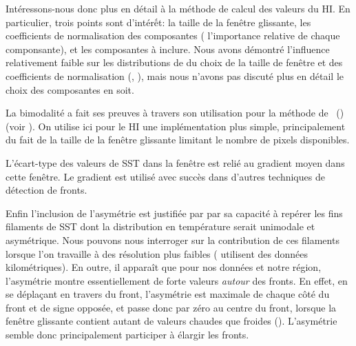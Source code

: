 Intéressons-nous donc plus en détail à la méthode de calcul des valeurs du HI.
En particulier, trois points sont d'intérết: la taille de la fenêtre glissante, les coefficients de normalisation des composantes ( l'importance relative de chaque componsante), et les composantes à inclure.
Nous avons démontré l'influence relativement faible sur les distributions de  du choix de la taille de fenêtre et des coefficients de normalisation (, ), mais nous n'avons pas discuté plus en détail le choix des composantes en soit.

La bimodalité a fait ses preuves à travers son utilisation pour la méthode de ~() (voir ).
On utilise ici pour le HI une implémentation plus simple, principalement du fait de la taille de la fenêtre glissante limitant le nombre de pixels disponibles.

L'écart-type des valeurs de SST dans la fenêtre est relié au gradient moyen dans cette fenêtre.
Le gradient est utilisé avec succès dans d'autres techniques de détection de fronts.

Enfin l'inclusion de l'asymétrie est justifiée par \textcite{liu_2016} par sa capacité à repérer les fins filaments de SST dont la distribution en température serait unimodale et asymétrique.
Nous pouvons nous interroger sur la contribution de ces filaments lorsque l'on travaille à des résolution plus faibles (\citeauthor{liu_2016} utilisent des données kilométriques).
En outre, il apparaît que pour nos données et notre région, l'asymétrie montre essentiellement de forte valeurs \emph{autour} des fronts.
En effet, en se déplaçant en travers du front, l'asymétrie est maximale de chaque côté du front et de signe opposée, et passe donc par zéro au centre du front, lorsque la fenêtre glissante contient autant de valeurs chaudes que froides ().
L'asymétrie semble donc principalement participer à élargir les fronts.

\begin{figure}
  \centering
  \label{fig:asymetrie}
\end{figure}

